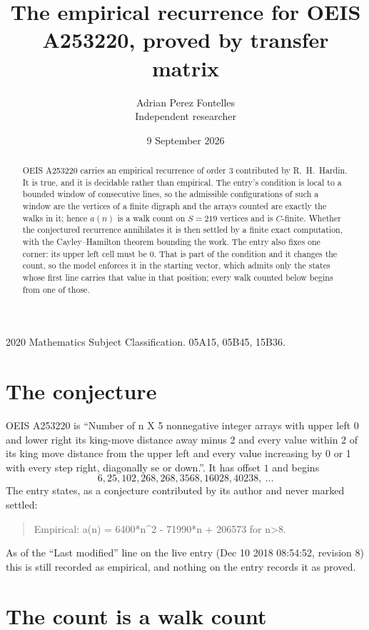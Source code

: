 \documentclass[11pt,a4paper]{article}
\title{The empirical recurrence for OEIS A253220, proved by transfer matrix}
\author{Adrian Perez Fontelles\\ \small Independent researcher}
\date{9 September 2026}
\theoremstyle{plain}
\theoremstyle{definition}
\begin{document}
\maketitle

\begin{abstract}
OEIS A253220 carries an empirical recurrence of order $3$ contributed by R.~H.~Hardin. It is
true, and it is decidable rather than empirical. The entry's condition is local to a bounded window of consecutive lines, so
the admissible configurations of such a window are the vertices of a finite digraph and the
arrays counted are exactly the walks in it; hence $a(n)$ is a walk count on $S=219$ vertices
and is $C$-finite. Whether the conjectured recurrence annihilates it is then settled by a
finite exact computation, with the Cayley--Hamilton theorem bounding the work.
 The entry also fixes one corner: its upper left cell must be $0$. That is part of the condition and it changes the count, so the model enforces it in the starting vector, which admits only the states whose first line carries that value in that position; every walk counted below begins from one of those.\end{abstract}

\noindent\small 2020 Mathematics Subject Classification. 05A15, 05B45, 15B36.\normalsize

\section{The conjecture}

OEIS A253220 is ``Number of n X 5 nonnegative integer arrays with upper left 0 and lower right its king-move distance away minus 2 and every value within 2 of its king move distance from the upper left and every value increasing by 0 or 1 with every step right, diagonally se or down.''. It has offset $1$ and begins
\[
6, 25, 102, 268, 268, 3568, 16028, 40238,\ \dots
\]
The entry states, as a conjecture contributed by its author and never marked settled:
\begin{quote}
Empirical: a(n) = 6400*n\^{}2 - 71990*n + 206573 for n>8.
\end{quote}
As of the ``Last modified'' line on the live entry (Dec 10 2018 08:54:52, revision 8) this is still
recorded as empirical, and nothing on the entry records it as proved.

\section{The count is a walk count}
\end{document}
